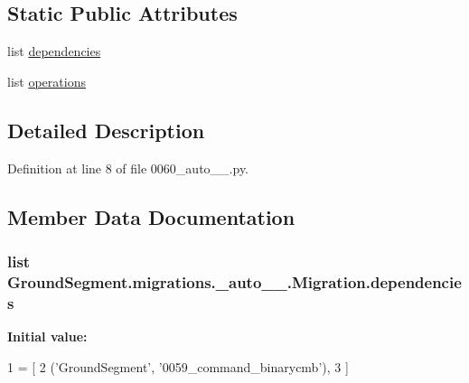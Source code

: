 \subsection*{Static Public Attributes}
\begin{DoxyCompactItemize}
\item 
list \hyperlink{class_ground_segment_1_1migrations_1_10060__auto__20170401__1620_1_1_migration_a25ce993285c32f63cdedbbec015fe214}{dependencies}
\item 
list \hyperlink{class_ground_segment_1_1migrations_1_10060__auto__20170401__1620_1_1_migration_a0fcb5f095ebecd9382372295d5680592}{operations}
\end{DoxyCompactItemize}


\subsection{Detailed Description}


Definition at line 8 of file 0060\+\_\+auto\+\_\+\_.\+py.



\subsection{Member Data Documentation}
\hypertarget{class_ground_segment_1_1migrations_1_10060__auto__20170401__1620_1_1_migration_a25ce993285c32f63cdedbbec015fe214}{}
\subsubsection[{dependencies}]{\setlength{\rightskip}{0pt plus 5cm}list Ground\+Segment.\+migrations.\+\_\+auto\+\_\+\_.\+Migration.\+dependencies\hspace{0.3cm}{\ttfamily [static]}}\label{class_ground_segment_1_1migrations_1_10060__auto__20170401__1620_1_1_migration_a25ce993285c32f63cdedbbec015fe214}
{\bfseries Initial value\+:}
\begin{DoxyCode}
1 = [
2         (\textcolor{stringliteral}{'GroundSegment'}, \textcolor{stringliteral}{'0059\_command\_binarycmb'}),
3     ]
\end{DoxyCode}


